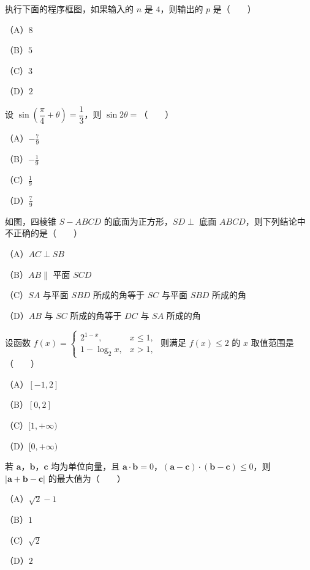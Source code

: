 \begin{question}
执行下面的程序框图，如果输入的 $n$ 是 $4$，则输出的 $p$ 是\mbox{（　　）}

（A）$8$

（B）$5$

（C）$3$

（D）$2$
\nopagebreak[4]
\begin{center}\end{center}
\nopagebreak[4]
\end{question}
\begin{question}
设 $\sin\left(\dfrac\pi4+\theta\right)=\dfrac13$，则 $\sin2\theta=$\mbox{（　　）}

（A）$-\frac79$

（B）$-\frac19$

（C）$\frac19$

（D）$\frac79$

\Needspace{0.4\textheight}
\end{question}
\begin{question}
如图，四棱锥 $S-ABCD$ 的底面为正方形，$SD\perp$ 底面 $ABCD$，则下列结论中不正确的是\mbox{（　　）}

（A）$AC\perp SB$

（B）$AB\parallel$ 平面 $SCD$

（C）$SA$ 与平面 $SBD$ 所成的角等于 $SC$ 与平面 $SBD$ 所成的角

（D）$AB$ 与 $SC$ 所成的角等于 $DC$ 与 $SA$ 所成的角
\nopagebreak[4]
\begin{center}\end{center}
\nopagebreak[4]
\end{question}
\begin{question}
设函数 $f(x)=\begin{cases}2^{1-x},&x\leqslant1,\\1-\log_2x,&x>1,\end{cases}$ 则满足 $f(x)\leqslant2$ 的 $x$ 取值范围是\mbox{（　　）}

（A）$[-1,2]$

（B）$[0,2]$

（C）$[1,+\infty)$

（D）$[0,+\infty)$

\end{question}
\begin{question}
若 $\boldsymbol a$，$\boldsymbol b$，$\boldsymbol c$ 均为单位向量，且 $\boldsymbol a\cdot\boldsymbol b=0$，$(\boldsymbol a-\boldsymbol c)\cdot(\boldsymbol b-\boldsymbol c)\leqslant0$，则 $|\boldsymbol a+\boldsymbol b-\boldsymbol c|$ 的最大值为\mbox{（　　）}

（A）$\sqrt2-1$

（B）$1$

（C）$\sqrt2$

（D）$2$

\end{question}
